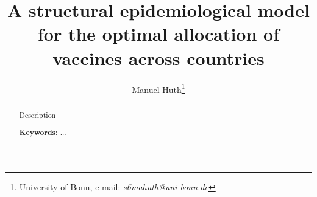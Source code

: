 
\title{A structural epidemiological model for the optimal allocation of vaccines across countries}

\author{Manuel Huth\thanks{University of Bonn, e-mail: \textit{s6mahuth@uni-bonn.de}}}

\maketitle

\sloppy


\begin{abstract}

\noindent
Description




\strut

\noindent \textbf{Keywords:} ... \\

\end{abstract}

\thispagestyle{empty}

\clearpage
